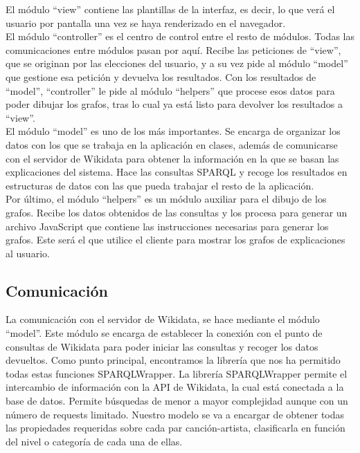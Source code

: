 El módulo ``view'' contiene las plantillas de la interfaz, es decir, lo que verá el usuario por pantalla una vez se haya renderizado en el navegador.\\

El módulo ``controller'' es el centro de control entre el resto de módulos. Todas las comunicaciones entre módulos pasan por aquí. Recibe las peticiones de ``view'', que se originan por las elecciones del usuario, y a su vez pide al módulo ``model'' que gestione esa petición y devuelva los resultados. Con los resultados de ``model'', ``controller'' le pide al módulo ``helpers'' que procese esos datos para poder dibujar los grafos, tras lo cual ya está listo para devolver los resultados a ``view''.\\

El módulo ``model'' es uno de los más importantes. Se encarga de organizar los datos con los que se trabaja en la aplicación en clases, además de comunicarse con el servidor de Wikidata para obtener la información en la que se basan las explicaciones del sistema. Hace las consultas SPARQL y recoge los resultados en estructuras de datos con las que pueda trabajar el resto de la aplicación.\\

Por último, el módulo ``helpers'' es un módulo auxiliar para el dibujo de los grafos. Recibe los datos obtenidos de las consultas y los procesa para generar un archivo JavaScript que contiene las instrucciones necesarias para generar los grafos. Este será el que utilice el cliente para mostrar los grafos de explicaciones al usuario.\\

\subsection{Comunicación}

La comunicación con el servidor de Wikidata, se hace mediante el módulo ``model''. Este módulo se encarga de establecer la conexión con el punto de consultas de Wikidata para poder iniciar las consultas y recoger los datos devueltos. Como punto principal, encontramos la librería que nos ha permitido todas estas funciones SPARQLWrapper. La librería SPARQLWrapper permite el intercambio de información con la API de Wikidata, la cual está conectada a la base de datos. Permite búsquedas de menor a mayor complejidad aunque con un número de requests limitado. Nuestro modelo se va a encargar de obtener todas las propiedades requeridas sobre cada par canción-artista, clasificarla en función del nivel o categoría de cada una de ellas.\\


